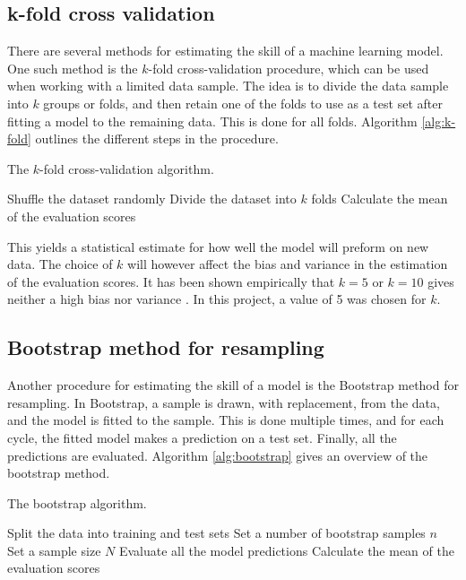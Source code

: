 \subsection{k-fold cross validation}
There are several methods for estimating the skill of a machine learning model. One such method is the $k$-fold cross-validation procedure, which can be used when working with a limited data sample. The idea is to divide the data sample into $k$ groups or folds, and then retain one of the folds to use as a test set after fitting a model to the remaining data. This is done for all folds. Algorithm \ref{alg:k-fold} outlines the different steps in the procedure.

\begin{algorithm}[htbp]\caption{The $k$-fold cross-validation algorithm.}\label{alg:k-fold}
	\SetAlgoLined
	\BlankLine
	\BlankLine
	Shuffle the dataset randomly\;
	Divide the dataset into $k$ folds\;
	Calculate the mean of the evaluation scores\;
	\BlankLine
	\BlankLine
\end{algorithm}

This yields a statistical estimate for how well the model will preform on new data. The choice of $k$ will however affect the bias and variance in the estimation of the evaluation scores. It has been shown empirically that $k=5$ or $k=10$ gives neither a high bias nor variance \citep{james2013introduction}. In this project, a value of 5 was chosen for $k$.

\subsection{Bootstrap method for resampling}
Another procedure for estimating the skill of a model is the Bootstrap method for resampling. In Bootstrap, a sample is drawn, with replacement, from the data, and the model is fitted to the sample. This is done multiple times, and for each cycle, the fitted model makes a prediction on a test set. Finally, all the predictions are evaluated. Algorithm \ref{alg:bootstrap} gives an overview of the bootstrap method.
\begin{algorithm}[htbp]\caption{The bootstrap algorithm.}\label{alg:bootstrap}
	\SetAlgoLined
	\BlankLine
	\BlankLine
	Split the data into training and test sets\;
	Set a number of bootstrap samples $n$\;
	Set a sample size $N$\;
	Evaluate all the model predictions\;
	Calculate the mean of the evaluation scores\;
	\BlankLine
	\BlankLine
\end{algorithm}

